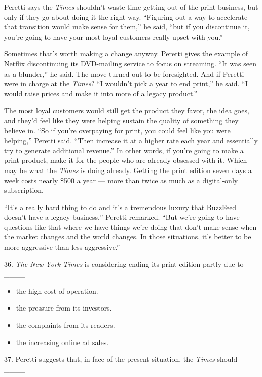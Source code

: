 \documentclass[UTF8,11pt]{ctexart}
\begin{document}
Peretti says the \textit{Times} shouldn’t waste time getting out of the print business, but only if they go about doing it the right way. “Figuring out a way to accelerate that transition would make sense for them,” he said, “but if you discontinue it, you’re going to have your most loyal customers really upset with you.”


Sometimes that’s worth making a change anyway. Peretti gives the example of Netflix discontinuing its DVD-mailing service to focus on streaming. “It was seen as a blunder,” he said. The move turned out to be foresighted. And if Peretti were in charge at the \textit{Times}? “I wouldn’t pick a year to end print,” he said. “I would raise prices and make it into more of a legacy product.”


The most loyal customers would still get the product they favor, the idea goes, and they’d feel like they were helping sustain the quality of something they believe in. “So if you’re overpaying for print, you could feel like you were helping,” Peretti said. “Then increase it at a higher rate each year and essentially try to generate additional revenue.” In other words, if you’re going to make a print product, make it for the people who are already obsessed with it. Which may be what the \textit{Times} is doing already. Getting the print edition seven days a week costs nearly \$500 a year — more than twice as much as a digital-only subscription.


“It’s a really hard thing to do and it’s a tremendous luxury that BuzzFeed doesn’t have a legacy business,” Peretti remarked. “But we’re going to have questions like that where we have things we’re doing that don’t make sense when the market changes and the world changes. In those situations, it’s better to be more aggressive than less aggressive.”


36. \textit{The New York Times} is considering ending its print edition partly due to \_\_\_\_


\begin{itemize}[leftmargin=2em,itemsep=.2em,topsep=.4em]\item[A.] the high cost of operation.
\item[B.] the pressure from its investors.
\item[C.] the complaints from its readers.
\item[D.] the increasing online ad sales.
\end{itemize}

37. Peretti suggests that, in face of the present situation, the \textit{Times} should \_\_\_\_
\end{document}
